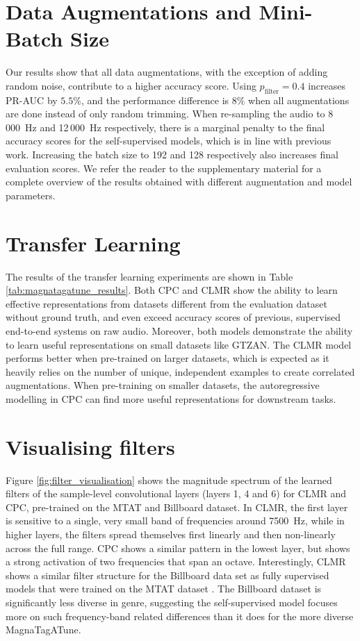 \documentclass{report}
\begin{document}
\section{Data Augmentations and Mini-Batch Size}
Our results show that all data augmentations, with the exception of adding random noise, contribute to a higher accuracy score. Using $p_{\mathrm{filter}}=0.4$ increases PR-AUC by $5.5\%$, and the performance difference is $8\%$ when all augmentations are done instead of only random trimming. When re-sampling the audio to 8\,000~Hz and 12\,000~Hz respectively, there is a marginal penalty to the final accuracy scores for the self-supervised models, which is in line with previous work\cite{lee2018samplecnn}. Increasing the batch size to 192 and 128 respectively also increases final evaluation scores. We refer the reader to the supplementary material for a complete overview of the results obtained with different augmentation and model parameters.

\section{Transfer Learning}
The results of the transfer learning experiments are shown in Table \ref{tab:magnatagatune_results}. Both CPC and CLMR show the ability to learn effective representations from datasets different from the evaluation dataset without ground truth, and even exceed accuracy scores of previous, supervised end-to-end systems on raw audio\cite{dieleman2014end}. Moreover, both models demonstrate the ability to learn useful representations on small datasets like GTZAN. The CLMR model performs better when pre-trained on larger datasets, which is expected as it heavily relies on the number of unique, independent examples to create correlated augmentations. When pre-training on smaller datasets, the autoregressive modelling in CPC can find more useful representations for downstream tasks.



\section{Visualising filters}
Figure \ref{fig:filter_visualisation} shows the magnitude spectrum of the learned filters of the sample-level convolutional layers (layers 1, 4 and 6) for CLMR and CPC, pre-trained on the MTAT and Billboard dataset. In CLMR, the first layer is sensitive to a single, very small band of frequencies around 7500~Hz, while in higher layers, the filters spread themselves first linearly and then non-linearly across the full range. CPC shows a similar pattern in the lowest layer, but shows a strong activation of two frequencies that span an octave. Interestingly, CLMR shows a similar filter structure for the Billboard data set as fully supervised models that were trained on the MTAT dataset \cite{dieleman2014end,lee2018samplecnn}. The Billboard dataset is significantly less diverse in genre, suggesting the self-supervised model focuses more on such frequency-band related differences than it does for the more diverse Magna\-Tag\-A\-Tune.
\end{document}

